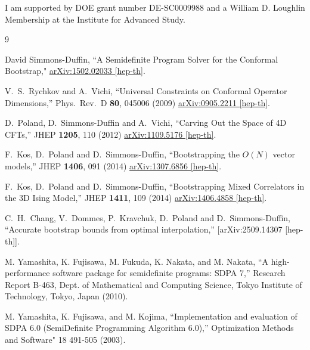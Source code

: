 \documentclass[12pt]{article}
\numberwithin{equation}{section}
\begin{document}
I am supported by DOE grant number DE-SC0009988 and a William D. Loughlin Membership at the Institute for Advanced Study.


\begin{thebibliography}{9}

  David Simmons-Duffin,
  ``A Semidefinite Program Solver for the Conformal Bootstrap,"
  \href{http://arxiv.org/abs/1502.02033}{arXiv:1502.02033 [hep-th]}.

  V.~S.~Rychkov and A.~Vichi,
  ``Universal Constraints on Conformal Operator Dimensions,''
  Phys.\ Rev.\ D {\bf 80}, 045006 (2009)
  \href{http://arxiv.org/abs/0905.2211}{arXiv:0905.2211 [hep-th]}.

  D.~Poland, D.~Simmons-Duffin and A.~Vichi,
  ``Carving Out the Space of 4D CFTs,''
  JHEP {\bf 1205}, 110 (2012)
  \href{http://arXiv.org/abs/1109.5176}{arXiv:1109.5176 [hep-th]}.
  
  F.~Kos, D.~Poland and D.~Simmons-Duffin,
  ``Bootstrapping the $O(N)$ vector models,''
  JHEP {\bf 1406}, 091 (2014)
  \href{http://arXiv.org/abs/1307.6856}{arXiv:1307.6856 [hep-th]}.

  F.~Kos, D.~Poland and D.~Simmons-Duffin,
  ``Bootstrapping Mixed Correlators in the 3D Ising Model,''
  JHEP {\bf 1411}, 109 (2014)
  \href{http://arXiv.org/abs/1406.4858}{arXiv:1406.4858 [hep-th]}.

  C.~H.~Chang, V.~Dommes, P.~Kravchuk, D.~Poland and D.~Simmons-Duffin,
  ``Accurate bootstrap bounds from optimal interpolation,''
  [arXiv:2509.14307 [hep-th]].


  M. Yamashita, K. Fujisawa, M. Fukuda, K. Nakata, and M. Nakata,
  ``A high-performance software package for semidefinite programs: SDPA 7,''
   Research Report B-463, Dept. of Mathematical and Computing Science, Tokyo Institute of Technology, Tokyo, Japan (2010).

  M. Yamashita, K. Fujisawa, and M. Kojima,
  ``Implementation and evaluation of SDPA 6.0 (SemiDefinite Programming Algorithm 6.0),''
  Optimization Methods and Software" 18 491-505 (2003).


\end{thebibliography}
\end{document}
